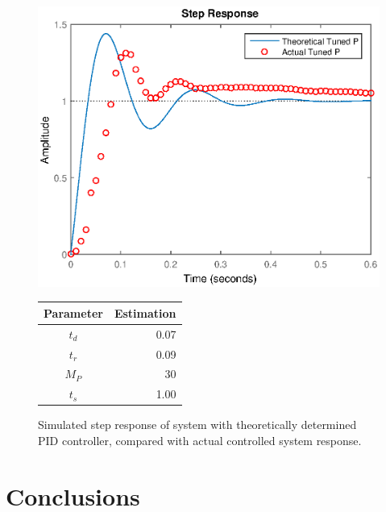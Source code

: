 \documentclass{article}
\begin{document}
\begin{figure}[H]
	\hspace{0.5cm}
	\begin{minipage}{7cm}
		\centering
		\includegraphics[scale=0.5]{fig18}
		\caption{Simulated step response of system with theoretically determined PID controller, compared with actual controlled system response.}
	\end{minipage}
	\hspace{1cm}
	\begin{minipage}{7cm}
		\begin{tabular}{cr}
			\toprule
			\textbf{Parameter} & \textbf{Estimation}\\
			\midrule
			$t_d$ & 0.07\\
			$t_r$ & 0.09\\
			$M_P$ & 30\\
			$t_s$ & 1.00\\
			\bottomrule
		\end{tabular}
	\end{minipage}
\end{figure}


\section{Conclusions}
\end{document}
